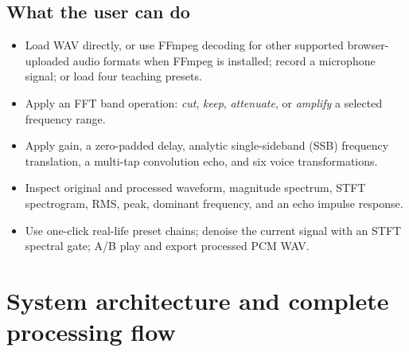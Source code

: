 \documentclass[11pt,a4paper]{article}
\begin{document}
\subsection{What the user can do}
\begin{itemize}
\item Load WAV directly, or use FFmpeg decoding for other supported browser-uploaded audio formats when FFmpeg is installed; record a microphone signal; or load four teaching presets.
\item Apply an FFT band operation: \emph{cut}, \emph{keep}, \emph{attenuate}, or \emph{amplify} a selected frequency range.
\item Apply gain, a zero-padded delay, analytic single-sideband (SSB) frequency translation, a multi-tap convolution echo, and six voice transformations.
\item Inspect original and processed waveform, magnitude spectrum, STFT spectrogram, RMS, peak, dominant frequency, and an echo impulse response.
\item Use one-click real-life preset chains; denoise the current signal with an STFT spectral gate; A/B play and export processed PCM WAV.
\end{itemize}

\section{System architecture and complete processing flow}
\begin{center}
\end{center}
\end{document}
